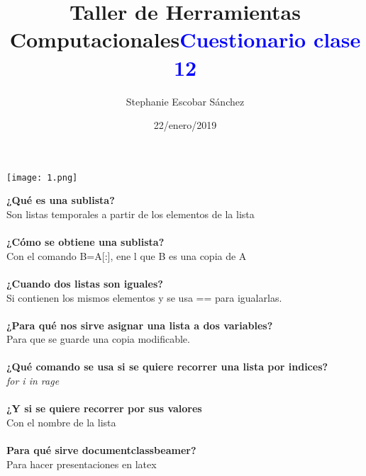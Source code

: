 \documentclass{article}
\title{\Huge Taller de Herramientas Computacionales}
\author{Stephanie Escobar Sánchez}
\date{22/enero/2019}
\begin{document}
	\maketitle
	\begin{center}
		\texttt{[image: 1.png]}	
	\end{center}
	\newpage
	\begin{center}
		\title {\textcolor{blue}{\Huge \textbf{Cuestionario clase 12}} }  
	\end{center}
\textbf{¿Qué es una sublista?}\\
Son listas temporales a partir de los elementos de la lista\\
\\
\textbf{¿Cómo se obtiene una sublista?}\\
Con el comando B=A[:], ene l que B es una copia de A\\
\\
\textbf{¿Cuando dos listas son iguales?}\\
Si contienen los mismos elementos y se usa == para igualarlas.\\
\\
\textbf{¿Para qué nos sirve asignar una lista a dos variables?}\\
Para que se guarde una copia modificable.\\
\\
\textbf{¿Qué comando se usa si se quiere recorrer una lista por indices?}\\
 \textit{for i in rage}\\
\\
\textbf{¿Y si se quiere recorrer por sus valores}\\
Con el nombre de la lista \\
\\ 
\textbf{Para qué sirve documentclass{beamer}?}\\
Para hacer presentaciones en latex
\end{document}
